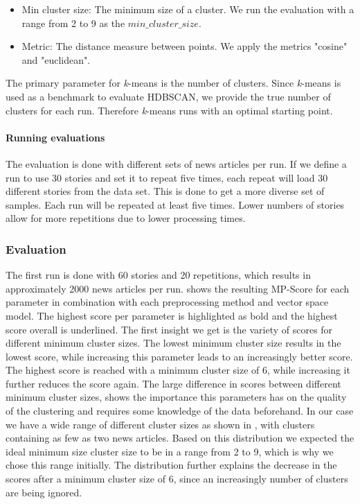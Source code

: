 \begin{itemize}
    \item Min cluster size: The minimum size of a cluster.
          We run the evaluation with a range from 2 to 9 as the $min\_cluster\_size$.
    \item Metric: The distance measure between points.
          We apply the metrics "cosine" and "euclidean".
\end{itemize}

The primary parameter for \textit{k}-means is the number of clusters.
Since \textit{k}-means is used as a benchmark to evaluate HDBSCAN, we provide the true number of clusters for each run.
Therefore \textit{k}-means runs with an optimal starting point.

\paragraph{Running evaluations}
The evaluation is done with different sets of news articles per run.
If we define a run to use 30 stories and set it to repeat five times,
each repeat will load 30 different stories from the data set.
This is done to get a more diverse set of samples.
Each run will be repeated at least five times.
Lower numbers of stories allow for more repetitions due to lower processing times.

\subsubsection{Evaluation}
\label{subsubsec:5a_evaluation}

The first run is done with 60 stories and 20 repetitions, which results in approximately 2000 news articles per run.
 shows the resulting MP-Score for each parameter
in combination with each preprocessing method and vector space model.
The highest score per parameter is highlighted as bold and the highest score overall is underlined.
The first insight we get is the variety of scores for different minimum cluster sizes.
The lowest minimum cluster size results in the lowest score,
while increasing this parameter leads to an increasingly better score.
The highest score is reached with a minimum cluster size of 6, while increasing it further reduces the score again.
The large difference in scores between different minimum cluster sizes,
shows the importance this parameters has on the quality of the clustering
and requires some knowledge of the data beforehand.
In our case we have a wide range of different cluster sizes as shown in ,
with clusters containing as few as two news articles.
Based on this distribution we expected the ideal minimum size cluster size to be in a range from 2 to 9,
which is why we chose this range initially.
The distribution further explains the decrease in the scores after a minimum cluster size of 6,
since an increasingly number of clusters are being ignored.

